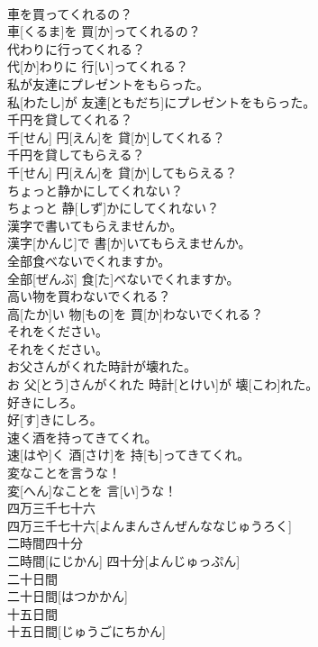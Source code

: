 \documentclass[8pt]{extreport}
\begin{document}
\begin{CJK}{UTF8}{min}
\\	車を買ってくれるの？	
\\	車[くるま]を 買[か]ってくれるの？	
\\	代わりに行ってくれる？	
\\	代[か]わりに 行[い]ってくれる？	
\\	私が友達にプレゼントをもらった。	
\\	私[わたし]が 友達[ともだち]にプレゼントをもらった。	
\\	千円を貸してくれる？	
\\	千[せん] 円[えん]を 貸[か]してくれる？	
\\	千円を貸してもらえる？	
\\	千[せん] 円[えん]を 貸[か]してもらえる？	
\\	ちょっと静かにしてくれない？	
\\	ちょっと 静[しず]かにしてくれない？	
\\	漢字で書いてもらえませんか。	
\\	漢字[かんじ]で 書[か]いてもらえませんか。	
\\	全部食べないでくれますか。	
\\	全部[ぜんぶ] 食[た]べないでくれますか。	
\\	高い物を買わないでくれる？	
\\	高[たか]い 物[もの]を 買[か]わないでくれる？	
\\	それをください。	
\\	それをください。	
\\	お父さんがくれた時計が壊れた。	
\\	お 父[とう]さんがくれた 時計[とけい]が 壊[こわ]れた。	
\\	好きにしろ。	
\\	好[す]きにしろ。	
\\	速く酒を持ってきてくれ。	
\\	速[はや]く 酒[さけ]を 持[も]ってきてくれ。	
\\	変なことを言うな！	
\\	変[へん]なことを 言[い]うな！	
\\	四万三千七十六	
\\	四万三千七十六[よんまんさんぜんななじゅうろく]	
\\	二時間四十分	
\\	二時間[にじかん] 四十分[よんじゅっぷん]	
\\	二十日間	
\\	二十日間[はつかかん]	
\\	十五日間	
\\	十五日間[じゅうごにちかん]	

\end{CJK}
\end{document}
